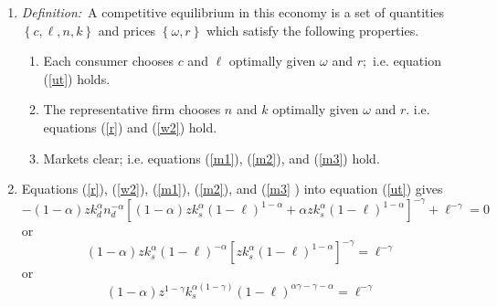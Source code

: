 \documentclass{article}
\begin{document}
\begin{enumerate}
\begin{enumerate}
\begin{enumerate}
\item labor market clearing: 
\begin{equation}
n_{d}=n_{s}=\left( 1-\ell \right)  \label{m2}
\end{equation}%
$.$

\item capital market clearing:%
\begin{equation}
k_{s}=k_{d}  \label{m3}
\end{equation}%
$.$
\end{enumerate}

\item \textit{Definition:}\ A competitive equilibrium in this economy is a
set of quantities $\left\{ c,\ell ,n,k\right\} $ and prices $\left\{ \omega
,r\right\} $ which satisfy the following properties.

\begin{enumerate}
\item Each consumer chooses $c$ and $\ell $ optimally given $\omega $ and $%
r; $ i.e. equation (\ref{ut}) holds$.$

\item The representative firm chooses $n$ and $k$ optimally given $\omega $
and $r.$ i.e. equations (\ref{r}) and (\ref{w2}) hold.

\item Markets clear; i.e. equations (\ref{m1}), (\ref{m2}), and (\ref{m3})
hold.
\end{enumerate}

\item Equations (\ref{r}), (\ref{w2}), (\ref{m1}), (\ref{m2}), and (\ref{m3}%
) into equation (\ref{ut}) gives 
\begin{equation*}
-\left( 1-\alpha \right) zk_{d}^{\alpha }n_{d}^{-\alpha }\left[ \left(
1-\alpha \right) zk_{s}^{\alpha }\left( 1-\ell \right) ^{1-\alpha }+\alpha
zk_{s}^{\alpha }\left( 1-\ell \right) ^{1-\alpha }\right] ^{-\gamma }+\ell
^{-\gamma }=0
\end{equation*}%
or%
\begin{equation*}
\left( 1-\alpha \right) zk_{s}^{\alpha }\left( 1-\ell \right) ^{-\alpha } 
\left[ zk_{s}^{\alpha }\left( 1-\ell \right) ^{1-\alpha }\right] ^{-\gamma
}=\ell ^{-\gamma }
\end{equation*}%
or%
\begin{equation}
\left( 1-\alpha \right) z^{1-\gamma }k_{s}^{\alpha \left( 1-\gamma \right)
}\left( 1-\ell \right) ^{\alpha \gamma -\gamma -\alpha }=\ell ^{-\gamma }
\label{ell}
\end{equation}


\end{enumerate}
\end{enumerate}
\end{document}
